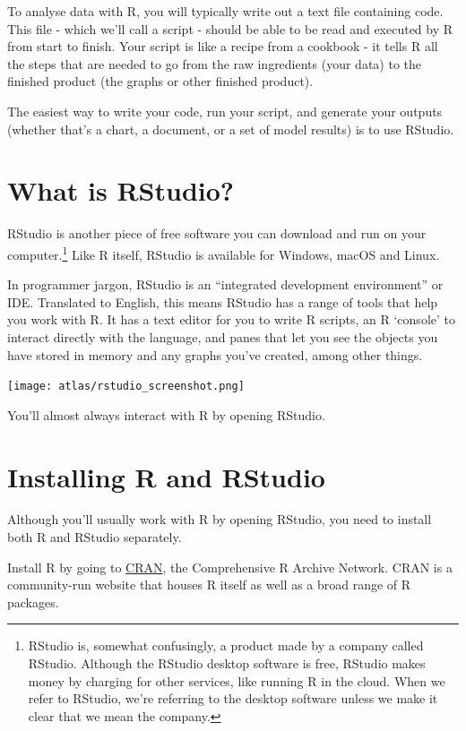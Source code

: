 \documentclass[
]{book}
\begin{document}
To analyse data with R, you will typically write out a text file containing code. This file - which we'll call a script - should be able to be read and executed by R from start to finish. Your script is like a recipe from a cookbook - it tells R all the steps that are needed to go from the raw ingredients (your data) to the finished product (the graphs or other finished product).

The easiest way to write your code, run your script, and generate your outputs (whether that's a chart, a document, or a set of model results) is to use RStudio.

\hypertarget{what-is-rstudio}{%
\section{What is RStudio?}\label{what-is-rstudio}}

RStudio is another piece of free software you can download and run on your computer.\footnote{RStudio is, somewhat confusingly, a product made by a company called RStudio. Although the RStudio desktop software is free, RStudio makes money by charging for other services, like running R in the cloud. When we refer to RStudio, we're referring to the desktop software unless we make it clear that we mean the company.} Like R itself, RStudio is available for Windows, macOS and Linux.

In programmer jargon, RStudio is an ``integrated development environment'' or IDE. Translated to English, this means RStudio has a range of tools that help you work with R. It has a text editor for you to write R scripts, an R `console' to interact directly with the language, and panes that let you see the objects you have stored in memory and any graphs you've created, among other things.

\texttt{[image: atlas/rstudio\_screenshot.png]}

You'll almost always interact with R by opening RStudio.

\hypertarget{installing-r-and-rstudio}{%
\section{Installing R and RStudio}\label{installing-r-and-rstudio}}

Although you'll usually work with R by opening RStudio, you need to install both R and RStudio separately.

Install R by going to \href{https://cran.r-project.org}{CRAN}, the Comprehensive R Archive Network. CRAN is a community-run website that houses R itself as well as a broad range of R packages.
\end{document}
